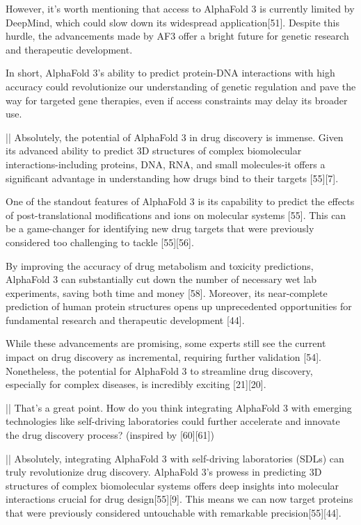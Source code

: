 \begin{showcase}[title=Topic: AlphaFold 3]
However, it's worth mentioning that access to AlphaFold 3 is currently limited by DeepMind, which could slow down its widespread application[51]. Despite this hurdle, the advancements made by AF3 offer a bright future for genetic research and therapeutic development.

In short, AlphaFold 3's ability to predict protein-DNA interactions with high accuracy could revolutionize our understanding of genetic regulation and pave the way for targeted gene therapies, even if access constraints may delay its broader use.

||
Absolutely, the potential of AlphaFold 3 in drug discovery is immense. Given its advanced ability to predict 3D structures of complex biomolecular interactions-including proteins, DNA, RNA, and small molecules-it offers a significant advantage in understanding how drugs bind to their targets [55][7]. 

One of the standout features of AlphaFold 3 is its capability to predict the effects of post-translational modifications and ions on molecular systems [55]. This can be a game-changer for identifying new drug targets that were previously considered too challenging to tackle [55][56]. 

By improving the accuracy of drug metabolism and toxicity predictions, AlphaFold 3 can substantially cut down the number of necessary wet lab experiments, saving both time and money [58]. Moreover, its near-complete prediction of human protein structures opens up unprecedented opportunities for fundamental research and therapeutic development [44]. 

While these advancements are promising, some experts still see the current impact on drug discovery as incremental, requiring further validation [54]. Nonetheless, the potential for AlphaFold 3 to streamline drug discovery, especially for complex diseases, is incredibly exciting [21][20].

|\moderatorbg{\moderator:}|
That's a great point. How do you think integrating AlphaFold 3 with emerging technologies like self-driving laboratories could further accelerate and innovate the drug discovery process? (inspired by [60][61])

||
Absolutely, integrating AlphaFold 3 with self-driving laboratories (SDLs) can truly revolutionize drug discovery. AlphaFold 3's prowess in predicting 3D structures of complex biomolecular systems offers deep insights into molecular interactions crucial for drug design[55][9]. This means we can now target proteins that were previously considered untouchable with remarkable precision[55][44].


\end{showcase}
